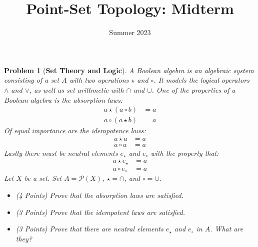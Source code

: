 \documentclass{article}
\title{Point-Set Topology: Midterm}
\date{Summer 2023}
\theoremstyle{normal}
\newtheorem{problem}{Problem}
\begin{document}
    \maketitle
    \begin{problem}[\textbf{Set Theory and Logic}]
        \par\hfill\par
        A Boolean algebra is an algebraic system consisting of a set $A$
        with two operations $\star$ and $\circ$. It models the logical
        operators $\land$ and $\lor$, as well as set arithmetic with
        $\cap$ and $\cup$. One of the properties of a Boolean algebra is the
        \textit{absorption laws}:
        \begin{align}
            a\star(a\circ{b})&=a\\
            a\circ(a\star{b})&=a
        \end{align}
        Of equal importance are the \textit{idempotence laws}:
        \begin{align}
            a\star{a}&=a\\
            a\circ{a}&=a
        \end{align}
        Lastly there must be neutral elements
        $e_{\star}$ and $e_{\circ}$ with the property that:
        \begin{align}
            a\star{e}_{\star}&=a\\
            a\circ{e}_{\circ}&=a
        \end{align}
        Let $X$ be a set. Set $A=\mathcal{P}(X)$, $\star=\cap$, and
        $\circ=\cup$.
        \begin{itemize}
            \item (4 Points) Prove that the absorption laws are satisfied.
            \item (3 Points) Prove that the idempotent laws are satisfied.
            \item (3 Points) Prove that there are neutral elements
                $e_{\star}$ and $e_{\circ}$ in $A$. What are they?
        \end{itemize}
    \end{problem}
\end{document}
